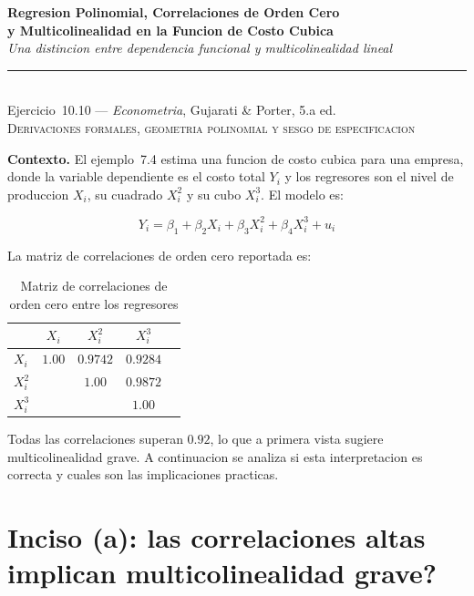 \documentclass[12pt, letterpaper]{article}
\theoremstyle{remark}
\begin{document}
\begin{center}
  {\LARGE\bfseries Regresion Polinomial, Correlaciones de Orden Cero}\\[6pt]
  {\LARGE\bfseries y Multicolinealidad en la Funcion de Costo Cubica}\\[12pt]
  {\large\itshape Una distincion entre dependencia funcional y multicolinealidad lineal}\\[14pt]
  \rule{0.55\linewidth}{0.6pt}\\[8pt]
  {\normalsize Ejercicio~10.10 --- \textit{Econometria}, Gujarati \& Porter, 5.a ed.}\\[4pt]
  {\small\textsc{Derivaciones formales, geometria polinomial y sesgo de especificacion}}
\end{center}

\vspace{10pt}

\noindent\textbf{Contexto.}\quad
El ejemplo~7.4 estima una funcion de costo cubica para una empresa, donde la
variable dependiente es el costo total $Y_i$ y los regresores son el nivel de
produccion $X_i$, su cuadrado $X_i^2$ y su cubo $X_i^3$. El modelo es:

\begin{equation}
  Y_i = \beta_1 + \beta_2 X_i + \beta_3 X_i^2 + \beta_4 X_i^3 + u_i
  \label{eq:cubica}
\end{equation}

\noindent La matriz de correlaciones de orden cero reportada es:

\begin{table}[ht]
\centering
\caption{Matriz de correlaciones de orden cero entre los regresores}
\label{tab:corr}
\small
\begin{tabular}{lcccc}
\toprule
         & $X_i$  & $X_i^2$ & $X_i^3$ \\
\midrule
$X_i$    & $1.00$ & $0.9742$ & $0.9284$ \\
$X_i^2$  &        & $1.00$   & $0.9872$ \\
$X_i^3$  &        &          & $1.00$   \\
\bottomrule
\end{tabular}
\end{table}

\noindent Todas las correlaciones superan $0.92$, lo que a primera vista sugiere
multicolinealidad grave. A continuacion se analiza si esta interpretacion es correcta
y cuales son las implicaciones practicas.

\section{Inciso (a): las correlaciones altas implican multicolinealidad grave?}
\end{document}
